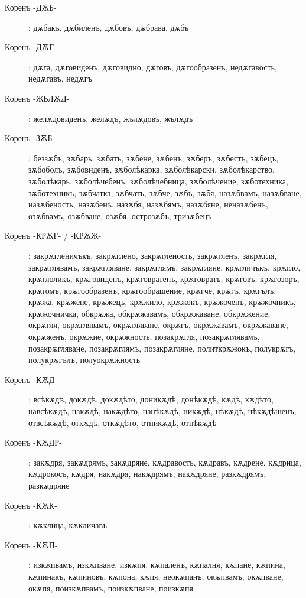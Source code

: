 \documentclass{article}
\begin{document}
\begin{description}
		\item[Коренъ -ДѪБ-]: дѫбакъ, дѫбиленъ, дѫбовъ, дѫбрава, дѫбъ
		
		\item[Коренъ -ДѪГ-]: дѫга, дѫговиденъ, дѫговидно, дѫговъ, дѫгообразенъ, недѫгавость, недѫгавъ, недѫгъ
		
		\item[Коренъ -ЖЬЛѪД-]: желѫдовиденъ, желѫдъ, жълѫдовъ, жълѫдъ
		
		\item[Коренъ -ЗѪБ-]: беззѫбъ, зѫбарь, зѫбатъ, зѫбене, зѫбенъ, зѫберъ, зѫбестъ, зѫбецъ, зѫбоболъ, зѫбовиденъ, зѫболѣкарка, зѫболѣкарски, зѫболѣкарство, зѫболѣкарь, зѫболѣчебенъ, зѫболѣчебница, зѫболѣчение, зѫботехника, зѫботехникъ, зѫбчатка, зѫбчатъ, зѫбче, зѫбъ, зѫбя, назѫбвамъ, назѫбване, назѫбеность, назѫбенъ, назѫбя, назѫбямъ, назѫбяне, неназѫбенъ, озѫбвамъ, озѫбване, озѫбя, острозѫбъ, тризѫбецъ
		
		\item[Коренъ -КРѪГ- / -КРѪЖ-]: закрѫгленичъкъ, закрѫглено, закрѫгленость, закрѫгленъ, закрѫгля, закрѫглявамъ, закрѫгляване, закрѫглямъ, закрѫгляне, крѫгличъкъ, крѫгло, крѫглоликъ, крѫговиденъ, крѫговратенъ, крѫговратъ, крѫговъ, крѫгозоръ, крѫгомъ, крѫгообразенъ, крѫгообращение, крѫгче, крѫгъ, крѫгълъ, крѫжа, крѫжене, крѫжецъ, крѫжило, крѫжокъ, крѫжоченъ, крѫжочникъ, крѫжочничка, обкрѫжа, обкрѫжавамъ, обкрѫжаване, обкрѫжение, окрѫгля, окрѫглявамъ, окрѫгляване, окрѫгъ, окрѫжавамъ, окрѫжаване, окрѫженъ, окрѫжие, окрѫжность, позакрѫгля, позакрѫглявамъ, позакрѫгляване, позакрѫглямъ, позакрѫгляне, политкрѫжокъ, полукрѫгъ, полукрѫгълъ, полуокрѫжность
		
		\item[Коренъ -КѪД-]: всѣкѫдѣ, докѫдѣ, докѫдѣто, доникѫдѣ, донѣкѫдѣ, кѫдѣ, кѫдѣто, навсѣкѫдѣ, накѫдѣ, накѫдѣто, нанѣкѫдѣ, никѫдѣ, нѣкѫдѣ, нѣкѫдѣшенъ, отвсѣкѫдѣ, откѫдѣ, откѫдѣто, отникѫдѣ, отнѣкѫдѣ
		
		\item[Коренъ -КѪДР-]: закѫдря, закѫдрямъ, закѫдряне, кѫдравость, кѫдравъ, кѫдрене, кѫдрица, кѫдрокосъ, кѫдря, накѫдря, накѫдрямъ, накѫдряне, разкѫдрямъ, разкѫдряне
		\item[Коренъ -КѪК-]: кѫклица, кѫкличавъ
		
		\item[Коренъ -КѪП-]: изкѫпвамъ, изкѫпване, изкѫпя, кѫпаленъ, кѫпалня, кѫпане, кѫпина, кѫпинакъ, кѫпиновъ, кѫпона, кѫпя, неокѫпанъ, окѫпвамъ, окѫпване, окѫпя, поизкѫпвамъ, поизкѫпване, поизкѫпя
		

\end{description}
\end{document}
